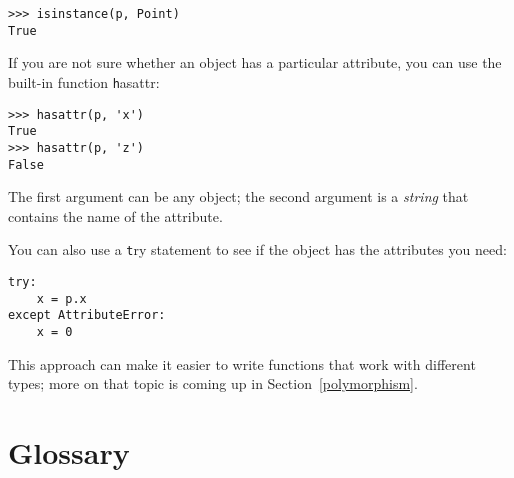 \documentclass[
DIV=11,
fontsize=12,
twoside,
headinclude=false,
titlepage=firstiscover,
abstract=true,
headsepline=true,
footsepline=true,
chapterprefix=true, %
headings=big,
bibliography=totoc,%
captions=tableheading
]{scrbook}
\theoremstyle{definition}
\begin{document}
\begin{lstlisting}
>>> isinstance(p, Point)
True
\end{lstlisting}
%
If you are not sure whether an object has a particular attribute,
you can use the built-in function {\texttt hasattr}:

\begin{lstlisting}
>>> hasattr(p, 'x')
True
>>> hasattr(p, 'z')
False
\end{lstlisting}
%
The first argument can be any object; the second argument is a {\em
string} that contains the name of the attribute.

You can also use a {\texttt try} statement to see if the object has the
attributes you need:

\begin{lstlisting}
try:
    x = p.x
except AttributeError:
    x = 0
\end{lstlisting}

This approach can make it easier to write functions that work with
different types; more on that topic is
coming up in Section~\ref{polymorphism}.


\section{Glossary}
\end{document}
